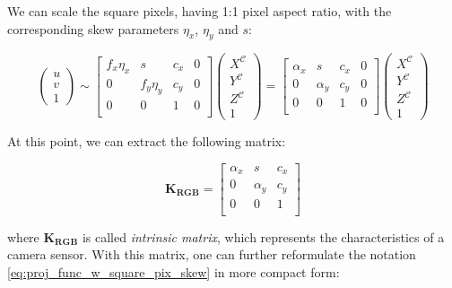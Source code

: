 \documentclass[a4paper]{report}
\numberwithin{figure}{section}
\begin{document}
We can scale the square pixels, having 1:1 pixel aspect ratio, with the 
corresponding skew parameters $\eta_x$, $\eta_y$ and $s$:

\begin{equation} \label{eq:proj_func_w_square_pix_skew}
  \begin{pmatrix}
    u\\
    v\\
    1
  \end{pmatrix}
  \sim
  \begin{bmatrix}
    f_x\eta_x & s & c_x & 0\\
    0 & f_y\eta_y & c_y & 0\\
    0 & 0 & 1 & 0\\
  \end{bmatrix}
  \begin{pmatrix}
    X^{\mathcal{C}}\\
    Y^{\mathcal{C}}\\
    Z^{\mathcal{C}}\\
    1
  \end{pmatrix}
  =
  \begin{bmatrix}
    \alpha_x & s & c_x & 0\\
    0 & \alpha_y & c_y & 0\\
    0 & 0 & 1 & 0\\
  \end{bmatrix}
  \begin{pmatrix}
    X^{\mathcal{C}}\\
    Y^{\mathcal{C}}\\
    Z^{\mathcal{C}}\\
    1
  \end{pmatrix}
\end{equation} 

At this point, we can extract the following matrix:

\begin{equation}
  \mathbf{K_{RGB}} = 
  \begin{bmatrix}
    \alpha_x & s & c_x\\
    0 & \alpha_y & c_y\\
    0 & 0 & 1\\
  \end{bmatrix}\label{eq:k_matrix}
\end{equation} 

where $\mathbf{K_{RGB}}$ is called \textit{intrinsic matrix}, which represents 
the characteristics of a camera sensor.  With this matrix, one can further 
reformulate the notation \eqref{eq:proj_func_w_square_pix_skew} in more 
compact 
form:
\end{document}

